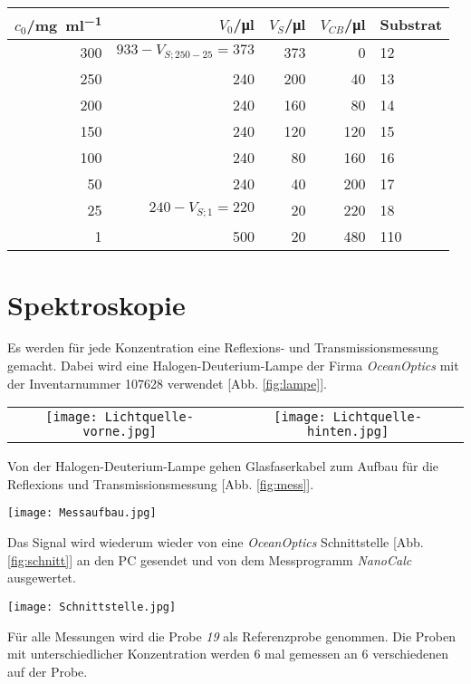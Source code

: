 \begin{center}
	\captionsetup{type=table}	
	\begin{tabular}{r | r | r r | l}
		$c_0$/\si{\milli\gram\per\milli\litre} & $V_0$/\si{\micro\litre}  & $V_S$/\si{\micro\litre} & $V_{CB}$/\si{\micro\litre} & Substrat \\[0,1cm]
		\hline
		300  &  $933 - V_{S;250-25} = 373$  &  373  &    0  &   12 \\
		250  &  					  240   &  200  &   40  &   13 \\
		200  &  					  240   &  160  &   80  &   14 \\
		150  &  					  240   &  120  &  120  &   15 \\
		100  &  					  240   &   80  &  160  &   16 \\
		 50  &  					  240   &   40  &  200  &   17 \\
		 25  &  $240 - V_{S;1}		= 220$  &   20  &  220  &   18 \\
		  1  &  					  500   &   20  &  480  &  110 \\
	\end{tabular}
	\label{tab:verduennung}
\end{center}

\section{Spektroskopie}
\label{sec:spectroskopie}

Es werden für jede Konzentration eine Reflexions- und Transmissionsmessung gemacht. Dabei wird eine Halogen-Deuterium-Lampe der Firma \textit{OceanOptics} mit der Inventarnummer 107628 verwendet [Abb. \ref{fig:lampe}].
\begin{center}
	\captionsetup{type=figure}
	\begin{tabular}{c c}
		\texttt{[image: Lichtquelle-vorne.jpg]} & \texttt{[image: Lichtquelle-hinten.jpg]}
	\end{tabular}
	\label{fig:lampe}
\end{center}
\newpage
Von der Halogen-Deuterium-Lampe gehen Glasfaserkabel zum Aufbau für die Reflexions und Transmissionsmessung [Abb. \ref{fig:mess}].
\begin{center}
	\captionsetup{type=figure}
	\texttt{[image: Messaufbau.jpg]}
	\label{fig:mess}
\end{center}
Das Signal wird wiederum wieder von eine \textit{OceanOptics} Schnittstelle [Abb. \ref{fig:schnitt}] an den PC gesendet und von dem Messprogramm \textit{NanoCalc} ausgewertet.
\begin{center}
	\captionsetup{type=figure}
	\texttt{[image: Schnittstelle.jpg]}
	\label{fig:schnitt}
\end{center}
\newpage
Für alle Messungen wird die Probe \textit{19} als Referenzprobe genommen. Die Proben mit unterschiedlicher Konzentration werden 6 mal gemessen an 6 verschiedenen auf der Probe.\bigskip

